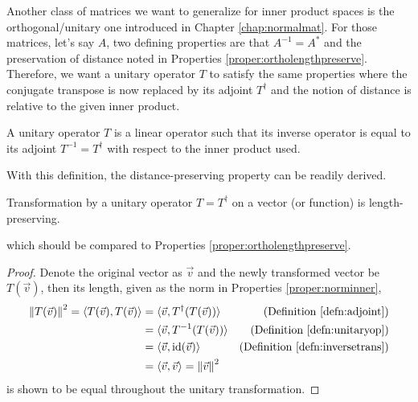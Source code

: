 Another class of matrices we want to generalize for inner product spaces is the orthogonal/unitary one introduced in Chapter \ref{chap:normalmat}. For those matrices, let's say $A$, two defining properties are that $A^{-1} = A^*$ and the preservation of distance noted in Properties \ref{proper:ortholengthpreserve}. Therefore, we want a unitary operator $T$ to satisfy the same properties where the conjugate transpose is now replaced by its adjoint $T^\dag$ and the notion of distance is relative to the given inner product.
\begin{defn}
\label{defn:unitaryop}
A unitary operator $T$ is a linear operator such that its inverse operator is equal to its adjoint $T^{-1} = T^\dag$ with respect to the inner product used.
\end{defn}
With this definition, the distance-preserving property can be readily derived.
\begin{proper}
Transformation by a unitary operator $T = T^\dag$ on a vector (or function) is length-preserving.
\end{proper}
which should be compared to Properties \ref{proper:ortholengthpreserve}.
\begin{proof}
Denote the original vector as $\vec{v}$ and the newly transformed vector be $T(\vec{v})$, then its length, given as the norm in Properties \ref{proper:norminner},
\begin{align*}
\norm{T(\vec{v})}^2 = \langle T(\vec{v}), T(\vec{v}) \rangle &= \langle \vec{v}, T^\dag(T(\vec{v})) \rangle & \text{(Definition \ref{defn:adjoint})} \\
&= \langle \vec{v}, T^{-1}(T(\vec{v})) \rangle & \text{(Definition \ref{defn:unitaryop})} \\
&= \langle \vec{v}, \text{id}(\vec{v}) \rangle & \text{(Definition \ref{defn:inversetrans})} \\
&= \langle \vec{v}, \vec{v} \rangle = \norm{\vec{v}}^2
\end{align*}
is shown to be equal throughout the unitary transformation.
\end{proof}
